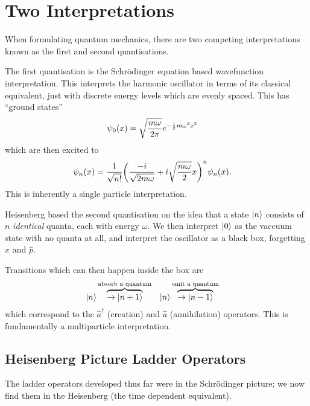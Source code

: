 \documentclass[notes.tex]{subfiles}
\begin{document}
\section{Two Interpretations}
When formulating quantum mechanics, there are two competing interpretations known as the first and second quantisations.

The first quantisation is the Schr\"odinger equation based wavefunction interpretation. This interprets the harmonic oscillator in terms of its classical equivalent, just with discrete energy levels which are evenly spaced. 
This has ``ground states'' 
\begin{align*}
    \psi_0(x) &= \sqrt{\frac{m\omega}{2\pi}} e^{-\frac{1}{2}{}m\omega^2x^2}
\end{align*}
which are then excited to
\begin{align*}
    \psi_n(x) &= \frac{1}{\sqrt{n!}} \qty(\frac{-i}{\sqrt{2m\omega}} + i\sqrt{\frac{m\omega}{2}}x)^n \psi_n(x).
\end{align*}
This is inherently a single particle interpretation.

Heisenberg based the second quantisation on the idea that a state $\ket{n}$ consists of $n$ \emph{identical} quanta, each with energy $\omega$.
We then interpret $\ket{0}$ as the vaccuum state with no quanta at all, and interpret the oscillator as a black box, forgetting $\hat{x}$ and $\hat{p}$.

Transitions which can then happen inside the box are 
\begin{align*}
    \ket{n}&\overbrace{\to\ket{n+1}}^{\text{absorb a quantum}}&\ket{n}&\overbrace{\to\ket{n-1}}^\text{emit a quantum}
\end{align*}
which correspond to the $\hat{a}^\dagger$ (creation) and $\hat{a}$ (annihilation) operators. This is fundamentally a multiparticle interpretation.

\subsection{Heisenberg Picture Ladder Operators}
The ladder operators developed thus far were in the Schr\"odinger picture; we now find them in the Heisenberg (\ie the time dependent equivalent). 
\end{document}
